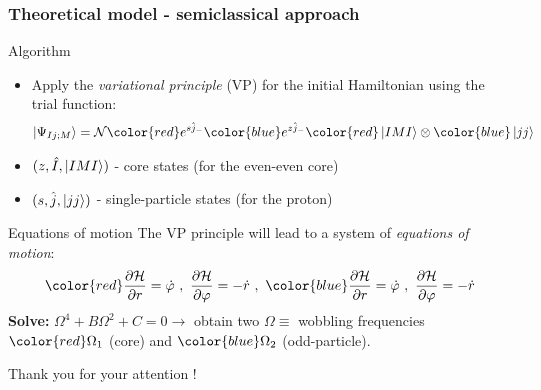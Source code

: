 \documentclass[
	11pt, %
]{beamer}
\begin{document}
\begin{frame}
	\frametitle{Theoretical model - semiclassical approach}
	\vspace{-0.5cm}
	\begin{block}{Algorithm}
		\begin{itemize}
			\item Apply the \emph{variational principle} (VP) for the initial Hamiltonian using the trial function:
			\vspace{-0.5cm}
			\begin{align}
				\ket{\Psi_{Ij;M}}=\mathcal{N}{\color{red}e^{s\hat{j}_-}}{\color{blue}e^{z\hat{j}_-}}{\color{red}\ket{IMI}}\otimes{\color{blue}\ket{jj}}
			\end{align}
			\item $(z,\hat{I},\ket{IMI})$ - core states (for the even-even core)
			\item $(s,\hat{j},\ket{jj})$ - single-particle states (for the proton)
		\end{itemize}
	\end{block}
	\vspace{-0.2cm}
	\begin{exampleblock}{Equations of motion}
		The VP principle will lead to a system of \emph{equations of motion}:
		\begin{align}
			{\color{red}\frac{\partial\mathcal{H}}{\partial r}=\dot{\varphi}\ ,\ \frac{\partial\mathcal{H}}{\partial \varphi}=-\dot{r}}\ ,\ {\color{blue}\frac{\partial\mathcal{H}}{\partial r}=\dot{\varphi}\ ,\ \frac{\partial\mathcal{H}}{\partial \varphi}=-\dot{r}}
		\end{align}
		\textbf{Solve:} $\Omega^4+B\Omega^2+C=0 \longrightarrow$ obtain two $\Omega\equiv$ wobbling frequencies ${\color{red}\Omega_1}$ (core) and ${\color{blue}\Omega_2}$ (odd-particle).
	\end{exampleblock}
\end{frame}


\begin{frame}[plain] %
	\begin{center}
		\bigskip\bigskip %
		{\Huge Thank you for your attention !}
	\end{center}
\end{frame}

\end{document}
